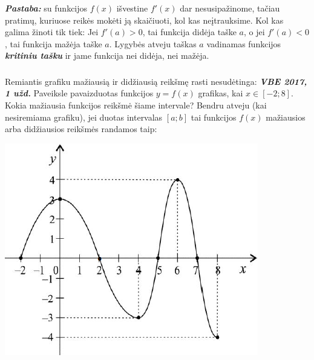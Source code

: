 \documentclass{article}
\begin{document}
\textbf{\textit{Pastaba:}} su funkcijos $f(x)$ išvestine $f'(x)$ dar nesusipažinome, tačiau pratimų, kuriuose reikės mokėti ją skaičiuoti, kol kas neįtrauksime. Kol kas galima žinoti tik tiek:
Jei $f'(a)>0$, tai funkcija didėja taške $a$, o jei $f'(a)<0$, tai funkcija mažėja taške $a$. Lygybės atveju taškas $a$ vadinamas funkcijos \textbf{\textit{kritiniu tašku}} ir jame funkcija nei didėja, nei mažėja.
\subsubsection*{}
\begin{minipage}[b]{0.65\linewidth}
Remiantis grafiku mažiausią ir didžiausią reikšmę rasti nesudėtinga:
\newline
\newline
\textbf{\textit{VBE 2017, 1 užd.}} Paveiksle pavaizduotas funkcijos $y=f(x)$ grafikas, kai $x \in [-2;8]$. Kokia mažiausia funkcijos reikšmė šiame intervale?
\newline
\newline
Bendru atveju (kai nesiremiama grafiku), jei duotas intervalas $[a;b]$ tai funkcijos $f(x)$ mažiausios arba didžiausios reikšmės randamos taip:
\end{minipage}
\begin{minipage}[m]{0.3\linewidth}
\includegraphics[width=\textwidth]{VBE2017_1.png}
\end{minipage}
\end{document}
